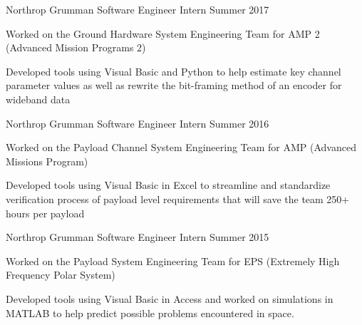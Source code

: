 \vspace{-3mm}
\vspace{-2mm}



\begin{cventries}
  \cventry
    {Northrop Grumman} %
    {Software Engineer Intern} %
    {Summer 2017} %
    {} %
    {
      \begin{cvitems} %
        \item {Worked on the Ground Hardware System Engineering Team for AMP 2 (Advanced Mission Programs 2)}
        \item {Developed tools using Visual Basic and Python to help estimate key channel parameter values as well as rewrite the bit-framing method of an encoder for wideband data}
      \end{cvitems}
    }


  \cventry
    {Northrop Grumman} %
    {Software Engineer Intern} %
    {Summer 2016} %
    {} %
    {
      \begin{cvitems} %
        \item {Worked on the Payload Channel System Engineering Team for AMP (Advanced Missions Program)}
        \item {Developed tools using Visual Basic in Excel to streamline and standardize verification process of payload level requirements that will save the team 250+ hours per payload}
      \end{cvitems}
    }

  \cventry
    {Northrop Grumman} %
    {Software Engineer Intern} %
    {Summer 2015} %
    {} %
    {
      \begin{cvitems} %
        \item {Worked on the Payload System Engineering Team for EPS (Extremely High Frequency Polar System)}
        \item {Developed tools using Visual Basic in Access and worked on simulations in MATLAB to help predict possible problems encountered in space.}
      \end{cvitems}
    }


\end{cventries}
